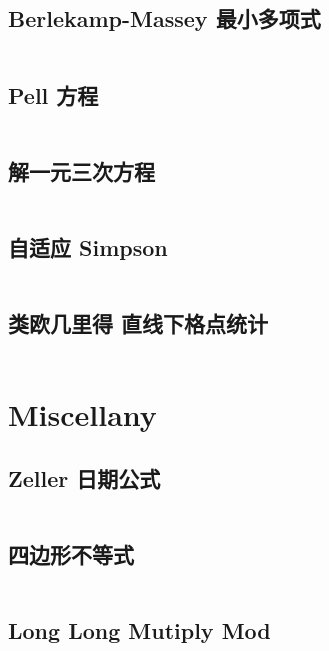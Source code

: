 \documentclass[titlepage, a4paper]{article}
\begin{document}
\begin{multicols}{2}
\begin{spacing}{0.6}
				\subsection{Berlekamp-Massey 最小多项式}
				\inputminted{cpp}{src/Math/Berlekamp-Massey.cpp}
				\subsection{Pell 方程}
				\inputminted{cpp}{src/Math/Pell方程.cpp}
				\subsection{解一元三次方程}
				\inputminted{cpp}{src/Math/解一元三次方程.cpp}
				\subsection{自适应 Simpson}
				\inputminted{cpp}{src/Math/Simpson.cpp}
				\subsection{类欧几里得 直线下格点统计}
				\inputminted{cpp}{src/Math/直线下格点统计.cpp}
			
			\section{Miscellany}
				\subsection{Zeller 日期公式}
				\inputminted{cpp}{src/Miscellany/日期公式.cpp}
				\subsection{四边形不等式}
				\inputminted{cpp}{src/Miscellany/2D1D.cpp}
				\subsection{Long Long Mutiply Mod}
				\inputminted{cpp}{src/Miscellany/LLFPM.cpp}

\end{spacing}
\end{multicols}
\end{document}

